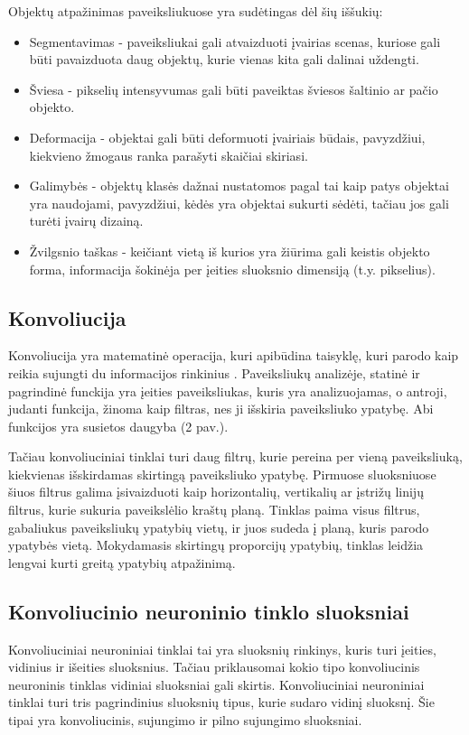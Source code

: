\documentclass{VUMIFPSkursinis}
\begin{document}
Objektų atpažinimas paveiksliukuose yra sudėtingas dėl šių iššukių:
\begin{itemize}
\item Segmentavimas - paveiksliukai gali atvaizduoti įvairias scenas, kuriose gali būti pavaizduota daug objektų, kurie vienas kita gali dalinai uždengti.
\item Šviesa - pikselių intensyvumas gali būti paveiktas šviesos šaltinio ar pačio objekto.
\item Deformacija - objektai gali būti deformuoti įvairiais būdais, pavyzdžiui, kiekvieno žmogaus ranka parašyti skaičiai skiriasi.
\item Galimybės - objektų klasės dažnai nustatomos pagal tai kaip patys objektai yra naudojami, pavyzdžiui, kėdės yra objektai sukurti sėdėti, tačiau jos gali turėti įvairų dizainą.
\item Žvilgsnio taškas - keičiant vietą iš kurios yra žiūrima gali keistis objekto forma, informacija šokinėja per įeities sluoksnio dimensiją (t.y. pikselius). 
\end{itemize}

\subsection{Konvoliucija}
Konvoliucija yra matematinė operacija, kuri apibūdina taisyklę, kuri parodo kaip reikia sujungti du informacijos rinkinius \cite{Convolution-book}. 
Paveiksliukų analizėje, statinė ir pagrindinė funckija yra įeities paveiksliukas, kuris yra analizuojamas, o antroji, judanti funkcija, žinoma 
kaip filtras, nes ji išskiria paveiksliuko ypatybę. Abi funkcijos yra susietos daugyba (2 pav.). 


Tačiau konvoliuciniai tinklai turi daug filtrų, kurie pereina per vieną paveiksliuką, kiekvienas išskirdamas skirtingą paveiksliuko ypatybę.
Pirmuose sluoksniuose šiuos filtrus galima įsivaizduoti kaip horizontalių, vertikalių ar įstrižų linijų filtrus, kurie sukuria paveikslėlio 
kraštų planą. Tinklas paima visus filtrus, gabaliukus paveiksliukų ypatybių vietų, ir juos sudeda į planą, kuris parodo ypatybės vietą. 
Mokydamasis skirtingų proporcijų ypatybių, tinklas leidžia lengvai kurti greitą ypatybių atpažinimą.

\subsection{Konvoliucinio neuroninio tinklo sluoksniai}
Konvoliuciniai neuroniniai tinklai tai yra sluoksnių rinkinys, kuris turi įeities, vidinius ir išeities sluoksnius. Tačiau priklausomai 
kokio tipo konvoliucinis neuroninis tinklas vidiniai sluoksniai gali skirtis. Konvoliuciniai neuroniniai tinklai turi tris pagrindinius 
sluoksnių tipus, kurie sudaro vidinį sluoksnį. Šie tipai yra konvoliucinis, sujungimo ir pilno sujungimo sluoksniai.
\end{document}
